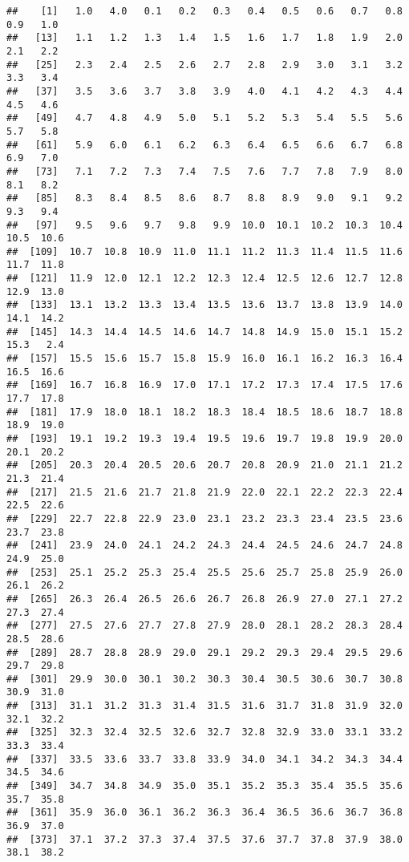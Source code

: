 \documentclass[
]{article}
\begin{document}
\begin{verbatim}
##    [1]   1.0   4.0   0.1   0.2   0.3   0.4   0.5   0.6   0.7   0.8   0.9   1.0
##   [13]   1.1   1.2   1.3   1.4   1.5   1.6   1.7   1.8   1.9   2.0   2.1   2.2
##   [25]   2.3   2.4   2.5   2.6   2.7   2.8   2.9   3.0   3.1   3.2   3.3   3.4
##   [37]   3.5   3.6   3.7   3.8   3.9   4.0   4.1   4.2   4.3   4.4   4.5   4.6
##   [49]   4.7   4.8   4.9   5.0   5.1   5.2   5.3   5.4   5.5   5.6   5.7   5.8
##   [61]   5.9   6.0   6.1   6.2   6.3   6.4   6.5   6.6   6.7   6.8   6.9   7.0
##   [73]   7.1   7.2   7.3   7.4   7.5   7.6   7.7   7.8   7.9   8.0   8.1   8.2
##   [85]   8.3   8.4   8.5   8.6   8.7   8.8   8.9   9.0   9.1   9.2   9.3   9.4
##   [97]   9.5   9.6   9.7   9.8   9.9  10.0  10.1  10.2  10.3  10.4  10.5  10.6
##  [109]  10.7  10.8  10.9  11.0  11.1  11.2  11.3  11.4  11.5  11.6  11.7  11.8
##  [121]  11.9  12.0  12.1  12.2  12.3  12.4  12.5  12.6  12.7  12.8  12.9  13.0
##  [133]  13.1  13.2  13.3  13.4  13.5  13.6  13.7  13.8  13.9  14.0  14.1  14.2
##  [145]  14.3  14.4  14.5  14.6  14.7  14.8  14.9  15.0  15.1  15.2  15.3   2.4
##  [157]  15.5  15.6  15.7  15.8  15.9  16.0  16.1  16.2  16.3  16.4  16.5  16.6
##  [169]  16.7  16.8  16.9  17.0  17.1  17.2  17.3  17.4  17.5  17.6  17.7  17.8
##  [181]  17.9  18.0  18.1  18.2  18.3  18.4  18.5  18.6  18.7  18.8  18.9  19.0
##  [193]  19.1  19.2  19.3  19.4  19.5  19.6  19.7  19.8  19.9  20.0  20.1  20.2
##  [205]  20.3  20.4  20.5  20.6  20.7  20.8  20.9  21.0  21.1  21.2  21.3  21.4
##  [217]  21.5  21.6  21.7  21.8  21.9  22.0  22.1  22.2  22.3  22.4  22.5  22.6
##  [229]  22.7  22.8  22.9  23.0  23.1  23.2  23.3  23.4  23.5  23.6  23.7  23.8
##  [241]  23.9  24.0  24.1  24.2  24.3  24.4  24.5  24.6  24.7  24.8  24.9  25.0
##  [253]  25.1  25.2  25.3  25.4  25.5  25.6  25.7  25.8  25.9  26.0  26.1  26.2
##  [265]  26.3  26.4  26.5  26.6  26.7  26.8  26.9  27.0  27.1  27.2  27.3  27.4
##  [277]  27.5  27.6  27.7  27.8  27.9  28.0  28.1  28.2  28.3  28.4  28.5  28.6
##  [289]  28.7  28.8  28.9  29.0  29.1  29.2  29.3  29.4  29.5  29.6  29.7  29.8
##  [301]  29.9  30.0  30.1  30.2  30.3  30.4  30.5  30.6  30.7  30.8  30.9  31.0
##  [313]  31.1  31.2  31.3  31.4  31.5  31.6  31.7  31.8  31.9  32.0  32.1  32.2
##  [325]  32.3  32.4  32.5  32.6  32.7  32.8  32.9  33.0  33.1  33.2  33.3  33.4
##  [337]  33.5  33.6  33.7  33.8  33.9  34.0  34.1  34.2  34.3  34.4  34.5  34.6
##  [349]  34.7  34.8  34.9  35.0  35.1  35.2  35.3  35.4  35.5  35.6  35.7  35.8
##  [361]  35.9  36.0  36.1  36.2  36.3  36.4  36.5  36.6  36.7  36.8  36.9  37.0
##  [373]  37.1  37.2  37.3  37.4  37.5  37.6  37.7  37.8  37.9  38.0  38.1  38.2

\end{verbatim}
\end{document}
